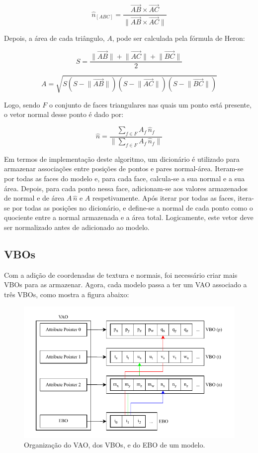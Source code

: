 \documentclass[12pt, a4paper]{article}
\begin{document}
$$
\hat{n}_{[ABC]} = \frac{
    \overrightarrow{AB} \times \overrightarrow{AC}
}{
    \lVert \overrightarrow{AB} \times \overrightarrow{AC} \rVert
}
$$

Depois, a área de cada triângulo, $A$, pode ser calculada pela fórmula de Heron:

$$
S = \frac{
    \lVert \overrightarrow{AB} \rVert +
    \lVert \overrightarrow{AC} \rVert +
    \lVert \overrightarrow{BC} \rVert
}{
    2
}
$$

$$
A = \sqrt{
    S
    \left ( S - \lVert \overrightarrow{AB} \rVert \right )
    \left ( S - \lVert \overrightarrow{AC} \rVert \right )
    \left ( S - \lVert \overrightarrow{BC} \rVert \right )
}
$$

Logo, sendo $F$ o conjunto de faces triangulares nas quais um ponto está presente, o vetor normal
desse ponto é dado por:

$$
\hat{n} = \frac{
    \sum_{f \in F} {A_f \, \hat{n}_f}
}{
    \lVert \sum_{f \in F} {A_f \, \hat{n}_f} \rVert
}
$$

Em termos de implementação deste algoritmo, um dicionário é utilizado para armazenar associações
entre posições de pontos e pares normal-área. Iteram-se por todas as faces do modelo e, para
cada face, calcula-se a sua normal e a sua área. Depois, para cada ponto nessa face, adicionam-se
aos valores armazenados de normal e de área $A \, \hat{n}$ e $A$ respetivamente. Após iterar por
todas as faces, itera-se por todas as posições no dicionário, e define-se a normal de cada ponto
como o quociente entre a normal armazenada e a área total. Logicamente, este vetor deve ser
normalizado antes de adicionado ao modelo.

\subsection{VBOs}

Com a adição de coordenadas de textura e normais, foi necessário criar mais VBOs para as armazenar.
Agora, cada modelo passa a ter um VAO associado a três VBOs, como mostra a figura abaixo:

\begin{figure}[H]
    \centering
    \includegraphics[width=\textwidth]{res/phase4/VAO.pdf}
    \caption{Organização do VAO, dos VBOs, e do EBO de um modelo.}
\end{figure}
\end{document}
